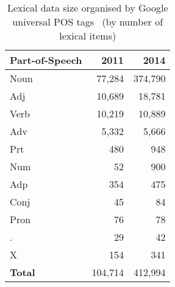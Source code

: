 \documentclass[11pt]{article}
\begin{document}
\begin{table}[h]
    \begin{center}
        \begin{tabular}{|l|rr|}
            \hline
            \bf Part-of-Speech & \bf 2011 & \bf 2014 \\
            \hline
            \sc Noun           & 77,284   & 374,790 \\
            \sc Adj            & 10,689   & 18,781 \\
            \sc Verb           & 10,219   & 10,889 \\
            \sc Adv            & 5,332    & 5,666 \\
            \sc Prt            & 480      & 948 \\
            \sc Num            & 52       & 900 \\
            \sc Adp            & 354      & 475 \\
            \sc Conj           & 45       & 84 \\
            \sc Pron           & 76       & 78 \\
            \sc .              & 29       & 42 \\
            \sc X              & 154      & 341 \\
            \hline
            \bf Total          & 104,714  & 412,994 \\
            \hline
        \end{tabular}
    \end{center}
    \caption{Lexical data size organised by Google universal
    POS tags~\cite{petrov2011universal} (by number of lexical items)}
\end{table}
\end{document}
